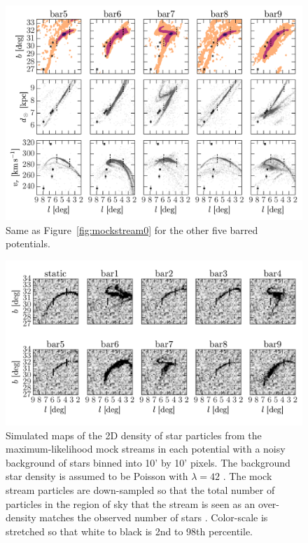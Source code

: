 \begin{figure}[p]
\begin{center}
\includegraphics[width=\textwidth]{figures/ch4/mockstream1}
\caption{ Same as Figure~\ref{fig:mockstream0} for the other five barred potentials. }
\label{fig:mockstream1}
\end{center}
\end{figure}


\begin{figure}[p]
\begin{center}
\includegraphics[width=\textwidth]{figures/ch4/densitymaps}
\caption{ Simulated maps of the 2D density of star particles from the
maximum-likelihood mock streams in each potential with a noisy background of
stars binned into 10' by 10' pixels. The background star density is assumed to
be Poisson with $\lambda = 42$ \citep[see Figure 3 in][where the typical
background density is $\approx\frac{60}{(0.2~{\deg})^2}$]{bernard14}. The mock
stream particles are down-sampled so that the total number of particles in the
region of sky that the stream is seen as an over-density matches the observed
number of stars \citep[$N\approx500$][]{bernard14}. Color-scale is stretched so
that white to black is 2nd to 98th percentile.}
\label{fig:densitymaps}
\end{center}
\end{figure}

